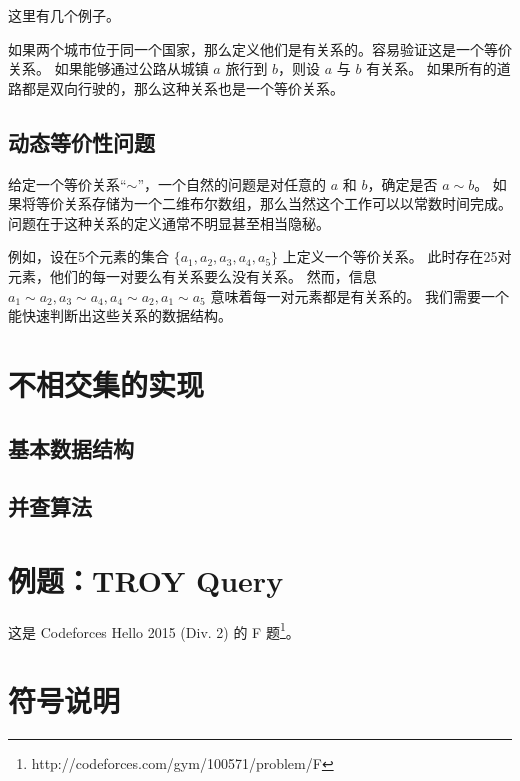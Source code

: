 \documentclass[withoutpreface,bwprint]{cumcmthesis}
\begin{document}
这里有几个例子。

如果两个城市位于同一个国家，那么定义他们是有关系的。容易验证这是一个等价关系。
如果能够通过公路从城镇 $a$ 旅行到 $b$，则设 $a$ 与 $b$ 有关系。
如果所有的道路都是双向行驶的，那么这种关系也是一个等价关系。

\subsection{动态等价性问题}

给定一个等价关系“$\sim$”，一个自然的问题是对任意的 $a$ 和 $b$，确定是否 $a\sim{}b$。
如果将等价关系存储为一个二维布尔数组，那么当然这个工作可以以常数时间完成。
问题在于这种关系的定义通常不明显甚至相当隐秘。

例如，设在5个元素的集合 $\{a_1,a_2,a_3,a_4,a_5\}$ 上定义一个等价关系。
此时存在25对元素，他们的每一对要么有关系要么没有关系。
然而，信息 $a_1\sim{}a_2, a_3\sim{}a_4, a_4\sim{}a_2, a_1\sim{}a_5$ 意味着每一对元素都是有关系的。
我们需要一个能快速判断出这些关系的数据结构。

\section{不相交集的实现}

\subsection{基本数据结构}



\subsection{并查算法}

\section{例题：TROY Query}

这是 Codeforces Hello 2015 (Div. 2) 的 F 题\footnote{http://codeforces.com/gym/100571/problem/F}。

\section{符号说明}
\end{document}
